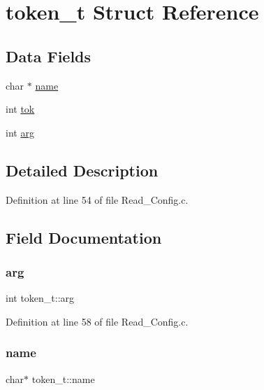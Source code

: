\hypertarget{structtoken__t}{}\section{token\+\_\+t Struct Reference}
\label{structtoken__t}
\subsection*{Data Fields}
\begin{DoxyCompactItemize}
\item 
char $\ast$ \hyperlink{structtoken__t_a6280ddf4c14a5d6079686deb5f415dfb}{name}
\item 
int \hyperlink{structtoken__t_ab6ff2146ea8b1275e249fd0412988215}{tok}
\item 
int \hyperlink{structtoken__t_a0196ebf4a7713197df326bb28c045c25}{arg}
\end{DoxyCompactItemize}


\subsection{Detailed Description}


Definition at line 54 of file Read\+\_\+\+Config.\+c.



\subsection{Field Documentation}
\mbox{\label{structtoken__t_a0196ebf4a7713197df326bb28c045c25}} 
\subsubsection{\texorpdfstring{arg}{arg}}
{\footnotesize\ttfamily int token\+\_\+t\+::arg}



Definition at line 58 of file Read\+\_\+\+Config.\+c.

\mbox{\label{structtoken__t_a6280ddf4c14a5d6079686deb5f415dfb}} 
\subsubsection{\texorpdfstring{name}{name}}
{\footnotesize\ttfamily char$\ast$ token\+\_\+t\+::name}



